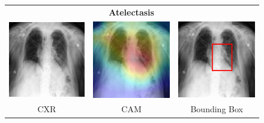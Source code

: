 \begin{figure}[htbp!]
\centering
\begin{tabular}{ccc}
 &\textbf{Atelectasis}& \\
\vspace{2mm}
  \includegraphics[width=35mm]{Tesi/images/CAMs/CAM4/image.png} &   
  \includegraphics[width=35mm]{Tesi/images/CAMs/CAM4/image_cam.png} &   
  \includegraphics[width=35mm]{Tesi/images/CAMs/CAM4/image_bbox.png} \\
\footnotesize{CXR} & \footnotesize{CAM} & \footnotesize{Bounding Box} \\[6pt]
\end{tabular}
\caption[Atelectasis CAM-1]{}
\label{fig:figure_5.18}
\end{figure}

